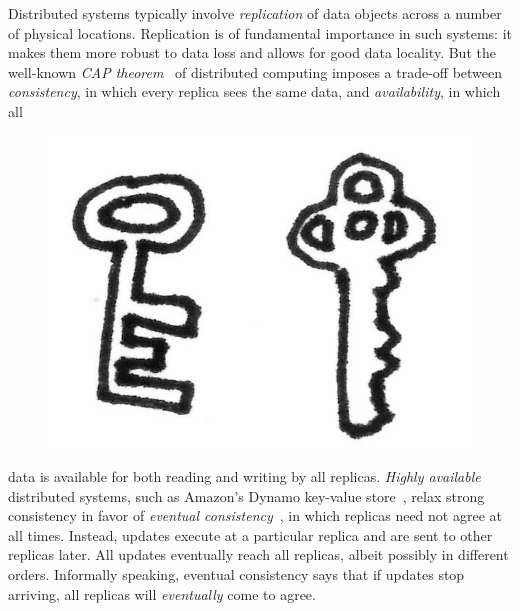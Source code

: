 Distributed systems typically involve \emph{replication} of data
objects across a number of physical locations.  Replication is of
fundamental importance in such systems: it makes them more robust to
data loss and allows for good data locality.  But the well-known
\emph{CAP theorem}~\cite{gilbert-lynch-cap, BrewerCAPBlog} of
distributed computing imposes a trade-off between \emph{consistency},
in which every replica sees the same data, and \emph{availability}, in
which all
\ifdefined\DISSERTATION
\begin{figure}
\vspace{-1em}
\begin{center}
  \includegraphics[scale=0.15]{../illustrations/keys}
\end{center}
\vspace{-1em}
\end{figure}
\fi
data is available for both reading and writing by all
replicas.  \emph{Highly available} distributed systems, such as
Amazon's Dynamo key-value store~\cite{dynamo}, relax strong
consistency in favor of \emph{eventual consistency}~\cite{vogels-ec},
in which replicas need not agree at all times.  Instead, updates
execute at a particular replica and are sent to other replicas
later. All updates eventually reach all replicas, albeit possibly in
different orders.  Informally speaking, eventual consistency says that
if updates stop arriving, all replicas will \emph{eventually} come to
agree.

